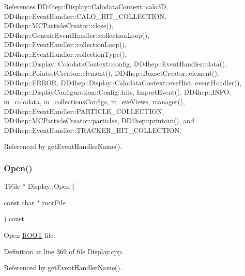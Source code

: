 References D\+D4hep\+::\+Display\+::\+Calodata\+Context\+::calo3D, D\+D4hep\+::\+Event\+Handler\+::\+C\+A\+L\+O\+\_\+\+H\+I\+T\+\_\+\+C\+O\+L\+L\+E\+C\+T\+I\+ON, D\+D4hep\+::\+M\+C\+Particle\+Creator\+::close(), D\+D4hep\+::\+Generic\+Event\+Handler\+::collection\+Loop(), D\+D4hep\+::\+Event\+Handler\+::collection\+Loop(), D\+D4hep\+::\+Event\+Handler\+::collection\+Type(), D\+D4hep\+::\+Display\+::\+Calodata\+Context\+::config, D\+D4hep\+::\+Event\+Handler\+::data(), D\+D4hep\+::\+Pointset\+Creator\+::element(), D\+D4hep\+::\+Boxset\+Creator\+::element(), D\+D4hep\+::\+E\+R\+R\+OR, D\+D4hep\+::\+Display\+::\+Calodata\+Context\+::eve\+Hist, event\+Handler(), D\+D4hep\+::\+Display\+Configuration\+::\+Config\+::hits, Import\+Event(), D\+D4hep\+::\+I\+N\+FO, m\+\_\+calodata, m\+\_\+collections\+Configs, m\+\_\+eve\+Views, manager(), D\+D4hep\+::\+Event\+Handler\+::\+P\+A\+R\+T\+I\+C\+L\+E\+\_\+\+C\+O\+L\+L\+E\+C\+T\+I\+ON, D\+D4hep\+::\+M\+C\+Particle\+Creator\+::particles, D\+D4hep\+::printout(), and D\+D4hep\+::\+Event\+Handler\+::\+T\+R\+A\+C\+K\+E\+R\+\_\+\+H\+I\+T\+\_\+\+C\+O\+L\+L\+E\+C\+T\+I\+ON.



Referenced by get\+Event\+Handler\+Name().

\hypertarget{class_d_d4hep_1_1_display_a661372cb8843f65c1fcf76fc0591885f}{}\label{class_d_d4hep_1_1_display_a661372cb8843f65c1fcf76fc0591885f} 
\subsubsection{\texorpdfstring{Open()}{Open()}}
{\footnotesize\ttfamily T\+File $\ast$ Display\+::\+Open (\begin{DoxyParamCaption}\item[{const char $\ast$}]{root\+File }\end{DoxyParamCaption}) const}



Open \hyperlink{namespace_r_o_o_t}{R\+O\+OT} file. 



Definition at line 369 of file Display.\+cpp.



Referenced by get\+Event\+Handler\+Name().

\hypertarget{class_d_d4hep_1_1_display_a89d76da3081a854a1a4a44dc6aec26eb}{}\label{class_d_d4hep_1_1_display_a89d76da3081a854a1a4a44dc6aec26eb} 
